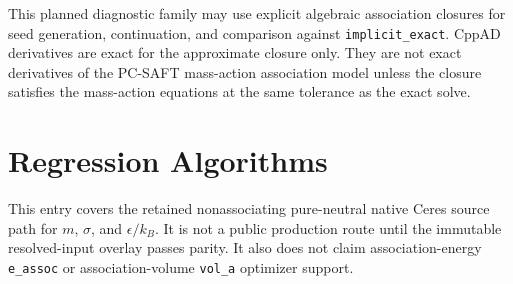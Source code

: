 \documentclass[12pt, letterpaper]{article}
\begin{document}
This planned diagnostic family may use explicit algebraic association closures
for seed generation, continuation, and comparison against
\texttt{implicit\_exact}. CppAD derivatives are exact for the approximate
closure only. They are not exact derivatives of the PC-SAFT mass-action
association model unless the closure satisfies the mass-action equations at the
same tolerance as the exact solve.

\section{Regression Algorithms}


This entry covers the retained nonassociating pure-neutral native Ceres source
path for \(m\), \(\sigma\), and \(\epsilon/k_B\). It is not a public
production route until the immutable resolved-input overlay passes parity. It
also does not claim association-energy \verb|e_assoc| or association-volume
\verb|vol_a| optimizer support.

\end{document}
